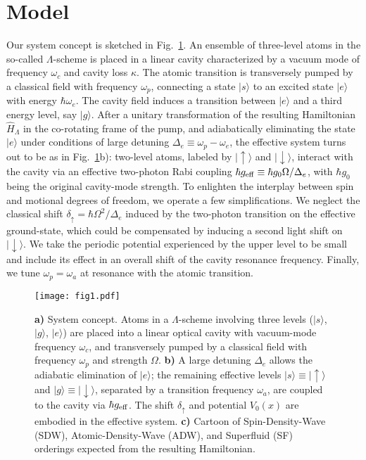 \documentclass[pra,aps,superscriptaddress,twocolumn]{revtex4}
\begin{document}
\section{Model}\label{sec:model}
Our system concept is sketched in Fig.~\ref{fig:fig1}.
An ensemble of three-level atoms in the so-called $\Lambda$-scheme is placed in a linear cavity characterized by
a vacuum mode of frequency $\omega_c$ and cavity loss $\kappa$. The atomic transition is transversely pumped by a classical field
with frequency $\omega_p$, connecting a state $|{s}\rangle$ to an excited state $|{e}\rangle$ with energy $\hbar \omega_e$.
The cavity field induces a transition between $|{e}\rangle$ and a third energy level, say
$|g\rangle$. After a unitary transformation of the resulting Hamiltonian $\hat H_\Lambda$
in the co-rotating frame of the pump, and adiabatically eliminating the state $|e\rangle$
under conditions of large detuning $\Delta_e \equiv \omega_p-\omega_e$,
the effective system turns out to be as in Fig.~\ref{fig:fig1}b): two-level atoms, labeled by
$|\!\!\uparrow\rangle$ and $|\!\!\downarrow\rangle$, interact with the cavity via an effective
two-photon Rabi coupling $\hbar g_{\rm eff} \equiv \hbar g_0 \Omega / \Delta_e$,
with $\hbar g_0$ being the original cavity-mode strength.
To enlighten the interplay between spin and motional degrees of freedom, we operate a few simplifications.
We neglect the classical shift $\delta_\uparrow=\hbar\Omega^2/\Delta_e$ induced by the two-photon
transition on the effective ground-state, which could be compensated by inducing a second light shift on $|\!\!\downarrow\rangle$.
We take the periodic potential experienced by the upper level to be small
and include its effect in an overall shift of the cavity resonance frequency. Finally,  we tune $\omega_p=\omega_a$ at resonance with the atomic transition.
\begin{figure}[htb]
  \texttt{[image: fig1.pdf]}
  \caption{{\bf a)} System concept. Atoms in a $\Lambda$-scheme involving three levels
      ($|{s}\rangle$, $|{g}\rangle$, $|{e}\rangle$) are placed into a linear optical cavity
      with vacuum-mode frequency $\omega_c$, and transversely pumped by a classical field with frequency $\omega_p$
      and strength $\Omega$.
      {\bf b)} A large detuning $\Delta_e$ allows the adiabatic elimination of $|e\rangle$; the remaining
      effective levels $|{s}\rangle \equiv |\!\!\uparrow\rangle$ and $|{g}\rangle \equiv |\!\!\downarrow \rangle$,
      separated by a transition frequency $\omega_a$, are coupled to the cavity via $\hbar g_{\rm eff}$.
      The shift $\delta_{\uparrow}$ and potential $V_0(x)$ are embodied in the effective system.
      {\bf c)} Cartoon of Spin-Density-Wave (SDW), Atomic-Density-Wave (ADW), and Superfluid (SF)
      orderings expected from the resulting Hamiltonian.}
  \label{fig:fig1}
\end{figure}
\end{document}
